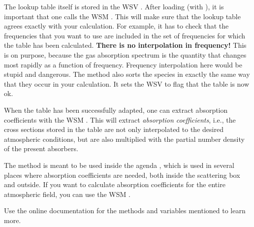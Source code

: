 
The lookup table itself is stored in the WSV
. After loading (with ),
it is important that one calls the WSM
. This will make sure that the lookup
table agrees exactly with your calculation. For example, it has to
check that the frequencies that you want to use are included in the
set of frequencies for which the table has been calculated.
\textbf{There is no interpolation in frequency!} This is on purpose,
because the gas absorption spectrum is the quantity that changes most
rapidly as a function of frequency. Frequency interpolation here would
be stupid and dangerous. The method also sorts the species in exactly
the same way that they occur in your calculation. It sets the WSV
 to flag that the table is now
ok.

When the table has been successfully adapted, one can extract
absorption coefficients with the WSM
. This will extract
\emph{absorption coefficients}, i.e., the cross sections stored in the
table are not only interpolated to the desired atmospheric conditions,
but are also multiplied with the partial number density of the present
absorbers. 

The  method is meant to
be used inside the agenda ,
which is used in several places where absorption coefficients are
needed, both inside the scattering box and outside. If you want to
calculate absorption coefficients for the entire atmospheric field,
you can use the WSM .

Use the online documentation for the methods and variables mentioned
to learn more.



